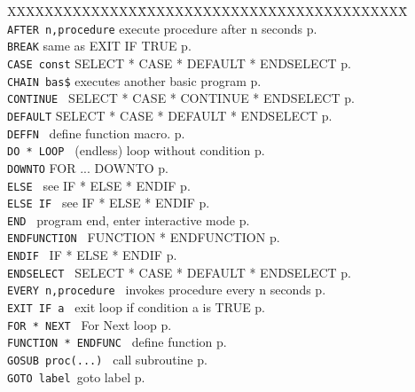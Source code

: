 \begin{tabbing}
XXXXXXXXXXXXXX\=XXXXXXXXXXXXXXXXXXXXXXXXXXXXX\=\kill\\
\verb|AFTER n,procedure|\> execute procedure after n seconds  \> p.\pageref{AFTER}\\
\verb|BREAK|           \> same as EXIT IF TRUE               \> p.\pageref{BREAK}\\
\verb|CASE const|      \> SELECT * CASE * DEFAULT * ENDSELECT\> p.\pageref{CASE}\\
{\tt CHAIN bas\$}\> executes another basic program           \> p.\pageref{CHAIN}\\
\verb|CONTINUE | \> SELECT * CASE * CONTINUE * ENDSELECT     \> p.\pageref{CONTINUE}\\
\verb|DEFAULT| 	 \> SELECT * CASE * DEFAULT * ENDSELECT      \> p.\pageref{DEFAULT}\\
\verb|DEFFN |    \> define function macro.                   \> p.\pageref{DEFFN} \\
{\tt DO * LOOP	}\> (endless) loop without condition         \> p.\pageref{DO}\\
\verb|DOWNTO|    \> FOR ... DOWNTO                   \> p.\pageref{DOWNTO} \\
{\tt ELSE		}\> see IF * ELSE * ENDIF            \> p.\pageref{ELSE}\\
{\tt ELSE IF	}\> see IF * ELSE * ENDIF            \> p.\pageref{ELSEbIF}\\
{\tt END		}\> program end, enter interactive mode\> p.\pageref{END}\\
{\tt ENDFUNCTION	}\> FUNCTION * ENDFUNCTION           \> p.\pageref{ENDFUNCTION}\\
{\tt ENDIF		}\> IF * ELSE * ENDIF                \> p.\pageref{ENDIF}\\
{\tt ENDSELECT		}\> SELECT * CASE * DEFAULT * ENDSELECT\> p.\pageref{ENDSELECT}\\
{\tt EVERY n,procedure	}\> invokes procedure every n seconds\> p.\pageref{EVERY}\\
{\tt EXIT IF a		}\> exit loop if condition a is TRUE \> p.\pageref{EXITbIF}\\
{\tt FOR * NEXT		}\> For Next loop                    \> p.\pageref{FOR}\\
{\tt FUNCTION * ENDFUNC	}\> define function                  \> p.\pageref{FUNCTION}\\
{\tt GOSUB proc(...) }   \> call subroutine                  \> p.\pageref{GOSUBbABBREVpba}\\
{\tt GOTO label		}\>goto label                        \> p.\pageref{GOTO}\\

\end{tabbing}
